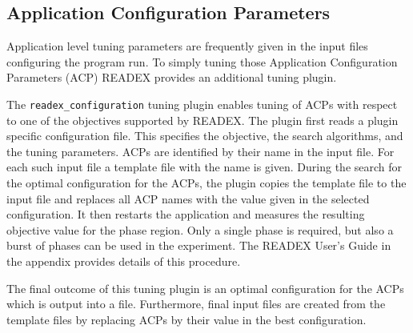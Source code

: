 \subsection{Application Configuration Parameters} \label{sec:acp}

Application level tuning parameters are frequently given in the input files configuring the program run. To simply tuning those Application Configuration Parameters (ACP) READEX provides an additional tuning plugin. 

The \texttt{readex\_configuration} tuning plugin enables tuning of ACPs with respect to one of the objectives supported by READEX. The plugin first reads a plugin specific configuration file. This specifies the objective, the search algorithms, and the tuning parameters. ACPs are identified by their name in the input file. For each such input file a template file with the name is given. During the search for the optimal configuration for the ACPs, the plugin copies the template file to the input file and replaces all ACP names with the value given in the selected configuration. It then restarts the application and measures the resulting objective value for the phase region. Only a single phase is required, but also a burst of phases can be used in the experiment. The READEX User's Guide in the appendix provides details of this procedure. 

The final outcome of this tuning plugin is an optimal configuration for the ACPs which is output into a file. Furthermore, final input files are created from the template files by replacing ACPs by their value in the best configuration.  
